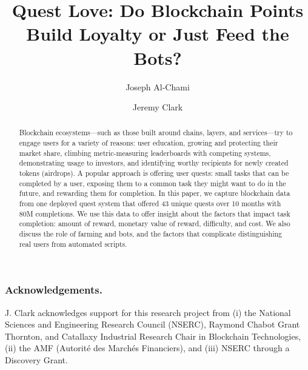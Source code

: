 \documentclass[runningheads]{llncs}
\begin{document}
\title{Quest Love: Do Blockchain Points Build Loyalty or Just Feed the Bots?}

\author{
	Joseph Al-Chami \and 
	Jeremy Clark
	}

	
	

\maketitle



\begin{abstract}

Blockchain ecosystems---such as those built around chains, layers, and services---try to engage users for a variety of reasons: user education, growing and protecting their market share, climbing metric-measuring leaderboards with competing systems, demonstrating usage to investors, and identifying worthy recipients for newly created tokens (airdrops). A popular approach is offering user quests: small tasks that can be completed by a user, exposing them to a common task they might want to do in the future, and rewarding them for completion. In this paper, we capture blockchain data from one deployed quest system that offered 43 unique quests over 10 months with 80M completions. We use this data to offer insight about the factors that impact task completion: amount of reward, monetary value of reward, difficulty, and cost. We also discuss the role of farming and bots, and the factors that complicate distinguishing real users from automated scripts.

\end{abstract}






\subsubsection*{Acknowledgements.} 
J. Clark acknowledges support for this research project from (i) the National Sciences and Engineering Research Council (NSERC), Raymond Chabot Grant Thornton, and Catallaxy Industrial Research Chair in Blockchain Technologies, (ii) the AMF (Autorité des Marchés Financiers), and (iii) NSERC through a Discovery Grant. 



\nocite{*}


\clearpage
\appendix
\end{document}
